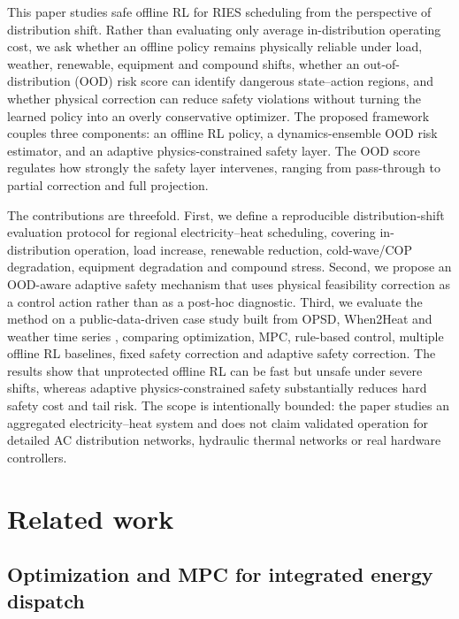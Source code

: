 \documentclass[preprint,12pt]{elsarticle}
\begin{document}
This paper studies safe offline RL for RIES scheduling from the perspective of distribution shift. Rather than evaluating only average in-distribution operating cost, we ask whether an offline policy remains physically reliable under load, weather, renewable, equipment and compound shifts, whether an out-of-distribution (OOD) risk score can identify dangerous state--action regions, and whether physical correction can reduce safety violations without turning the learned policy into an overly conservative optimizer. The proposed framework couples three components: an offline RL policy, a dynamics-ensemble OOD risk estimator, and an adaptive physics-constrained safety layer. The OOD score regulates how strongly the safety layer intervenes, ranging from pass-through to partial correction and full projection.

The contributions are threefold. First, we define a reproducible distribution-shift evaluation protocol for regional electricity--heat scheduling, covering in-distribution operation, load increase, renewable reduction, cold-wave/COP degradation, equipment degradation and compound stress. Second, we propose an OOD-aware adaptive safety mechanism that uses physical feasibility correction as a control action rather than as a post-hoc diagnostic. Third, we evaluate the method on a public-data-driven case study built from OPSD, When2Heat and weather time series \cite{OPSD2020TimeSeries,Moller2019When2Heat}, comparing optimization, MPC, rule-based control, multiple offline RL baselines, fixed safety correction and adaptive safety correction. The results show that unprotected offline RL can be fast but unsafe under severe shifts, whereas adaptive physics-constrained safety substantially reduces hard safety cost and tail risk. The scope is intentionally bounded: the paper studies an aggregated electricity--heat system and does not claim validated operation for detailed AC distribution networks, hydraulic thermal networks or real hardware controllers.

\section{Related work}

\subsection{Optimization and MPC for integrated energy dispatch}
\end{document}
